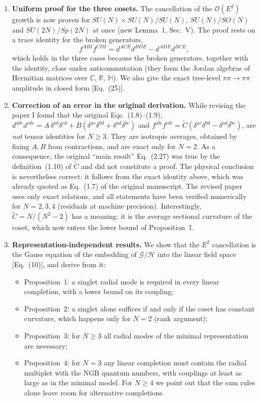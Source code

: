 \documentclass[11pt,a4paper]{article}
\begin{document}
\begin{enumerate}[leftmargin=*]
\item \textbf{Uniform proof for the three cosets.} The cancellation of the $\mathcal{O}(E^2)$ growth is now proven for $SU(N)\times SU(N)/SU(N)$, $SU(N)/SO(N)$ and $SU(2N)/Sp(2N)$ at once (new Lemma~1, Sec.~V). The proof rests on a trace identity for the broken generators,
\[
f^{ABI}f^{CDI}=d^{ACE}d^{BDE}-d^{ADE}d^{BCE},
\]
which holds in the three cases because the broken generators, together with the identity, close under anticommutation (they form the Jordan algebras of Hermitian matrices over $\mathbb{C}$, $\mathbb{R}$, $\mathbb{H}$). We also give the exact tree-level $\pi\pi\to\pi\pi$ amplitude in closed form [Eq.~(25)].

\item \textbf{Correction of an error in the original derivation.} While revising the paper I found that the original Eqs.~(1.8)--(1.9), $d^{abe}d^{cde}=A\,\delta^{ab}\delta^{cd}+B(\delta^{ac}\delta^{bd}+\delta^{ad}\delta^{bc})$ and $f^{abi}f^{cdi}=\tilde C(\delta^{ac}\delta^{bd}-\delta^{ad}\delta^{bc})$, are \emph{not} tensor identities for $N\ge3$. They are isotropic averages, obtained by fixing $A,B$ from contractions, and are exact only for $N=2$. As a consequence, the original ``main result'' Eq.~(2.27) was true by the definition~(1.10) of $\tilde C$ and did not constitute a proof. The physical conclusion is nevertheless correct: it follows from the exact identity above, which was already quoted as Eq.~(1.7) of the original manuscript. The revised paper uses only exact relations, and all statements have been verified numerically for $N=2,3,4$ (residuals at machine precision). Interestingly, $\tilde C=N/(N^2-2)$ has a meaning: it is the average sectional curvature of the coset, which now enters the lower bound of Proposition~1.

\item \textbf{Representation-independent results.} We show that the $E^2$ cancellation is the Gauss equation of the embedding of $\mathcal{G}/\mathcal{H}$ into the linear field space [Eq.~(10)], and derive from it:
\begin{itemize}[nosep]
\item Proposition~1: a singlet radial mode is required in every linear completion, with a lower bound on its coupling;
\item Proposition~2: a singlet alone suffices if and only if the coset has constant curvature, which happens only for $N=2$ (rank argument);
\item Proposition~3: for $N\ge3$ all radial modes of the minimal representation are necessary;
\item Proposition~4: for $N=3$ any linear completion must contain the radial multiplet with the NGB quantum numbers, with couplings at least as large as in the minimal model. For $N\ge4$ we point out that the sum rules alone leave room for alternative completions.
\end{itemize}


\end{enumerate}
\end{document}

